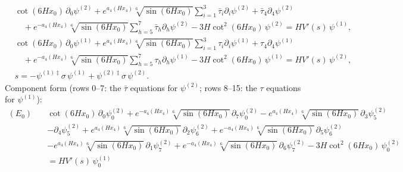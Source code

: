 \begin{align*}
& \cot \left(6 H x_0\right)\,\partial_0\psi^{(2)} + e^{a_4\left(H x_4\right)} \sqrt[6]{\sin \left(6 H x_0\right)}\sum_{i=1}^{3}\bar\tau_i\partial_i\psi^{(2)} + \bar\tau_4\partial_4\psi^{(2)} \\
& \quad + e^{-a_4\left(H x_4\right)} \sqrt[6]{\sin \left(6 H x_0\right)}\sum_{h=5}^{7}\bar\tau_h\partial_h\psi^{(2)} - 3H\cot ^2\left(6 H x_0\right)\,\psi^{(2)} = H V'(s)\,\psi^{(1)}, \\[4pt]
& \cot \left(6 H x_0\right)\,\partial_0\psi^{(1)} + e^{a_4\left(H x_4\right)} \sqrt[6]{\sin \left(6 H x_0\right)}\sum_{i=1}^{3}\tau_i\partial_i\psi^{(1)} + \tau_4\partial_4\psi^{(1)} \\
& \quad + e^{-a_4\left(H x_4\right)} \sqrt[6]{\sin \left(6 H x_0\right)}\sum_{h=5}^{7}\tau_h\partial_h\psi^{(1)} - 3H\cot ^2\left(6 H x_0\right)\,\psi^{(1)} = H V'(s)\,\psi^{(2)}, \\[4pt]
& s = -\psi^{(1)\ddagger}\sigma\,\psi^{(1)} + \psi^{(2)\ddagger}\sigma\,\psi^{(2)} .
\end{align*}
Component form (rows 0--7: the $\bar\tau$ equations for $\psi^{(2)}$; rows 8--15: the $\tau$ equations for $\psi^{(1)}$):
\begin{align*}
(E_{0})\quad & \cot \left(6 H x_0\right)\,\partial_{0}\psi^{(2)}_{0} + e^{-a_4\left(H x_4\right)} \sqrt[6]{\sin \left(6 H x_0\right)}\,\partial_{7}\psi^{(2)}_{0} - e^{a_4\left(H x_4\right)} \sqrt[6]{\sin \left(6 H x_0\right)}\,\partial_{3}\psi^{(2)}_{5} \\
 &  - \partial_{4}\psi^{(2)}_{5} + e^{a_4\left(H x_4\right)} \sqrt[6]{\sin \left(6 H x_0\right)}\,\partial_{2}\psi^{(2)}_{6} + e^{-a_4\left(H x_4\right)} \sqrt[6]{\sin \left(6 H x_0\right)}\,\partial_{5}\psi^{(2)}_{6} \\
 &  - e^{a_4\left(H x_4\right)} \sqrt[6]{\sin \left(6 H x_0\right)}\,\partial_{1}\psi^{(2)}_{7} + e^{-a_4\left(H x_4\right)} \sqrt[6]{\sin \left(6 H x_0\right)}\,\partial_{6}\psi^{(2)}_{7} - 3 H \cot ^2\left(6 H x_0\right)\,\psi^{(2)}_{0} \\
 & = H V'(s)\,\psi^{(1)}_{0}
\end{align*}
